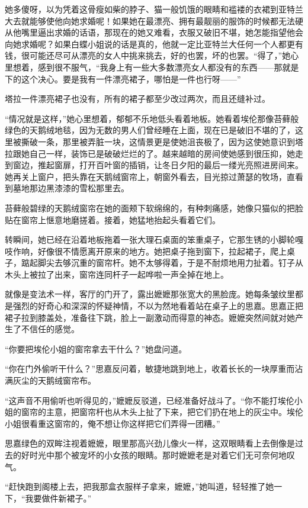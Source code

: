 \par 她多傻呀，以为凭着这骨瘦如柴的脖子、猫一般饥饿的眼睛和褴褛的衣裙到亚特兰大去就能够使他向她求婚呢！如果她在最漂亮、拥有最靓丽的服饰的时候都无法硬从他嘴里逼出求婚的话语，那现在的她又难看，衣服又破旧不堪，她怎能指望他会向她求婚呢？如果白蝶小姐说的话是真的，他就一定比亚特兰大任何一个人都更有钱，很可能还尽可从漂亮的女人中挑来挑去，好的也罢，坏的也罢。“得了，”她心里想着，感到很不服气，“我身上有一些大多数漂亮女人都没有的东西——那就是下的这个决心。要是我有一件漂亮裙子，哪怕是一件也行呀——”
\par 塔拉一件漂亮裙子也没有，所有的裙子都至少改过两次，而且还缝补过。
\par “情况就是这样，”她心里想着，郁郁不乐地低头看着地板。她看着埃伦那像苔藓般绿色的天鹅绒地毯，因为无数的男人们曾经睡在上面，现在已是破旧不堪的了，这里被撕破一条，那里被弄脏一块，这情景更是使她沮丧极了，因为这使她意识到塔拉跟她自己一样，装饰已是破破烂烂的了。越来越暗的房间使她感到很压抑，她走到窗边，推起窗扉，打开百叶窗的插销，让冬日夕阳的最后一缕光亮照进房间来。她再关上窗户，把头靠在天鹅绒窗帘上，朝窗外看去，目光掠过萧瑟的牧场，直看到墓地那边黑漆漆的雪松那里去。
\par 苔藓般碧绿的天鹅绒窗帘在她的面颊下软绵绵的，有种刺痛感，她像只猫似的把脸贴在窗帘上惬意地磨搓着。接着，她猛地抬起头看着它们。
\par 转瞬间，她已经在沿着地板拖着一张大理石桌面的笨重桌子，它那生锈的小脚轮嘎吱作响，好像很不情愿离开原来的地方。她把桌子拖到窗下，拉起裙子，爬上桌子，踮起脚尖去够沉重的窗帘杆。她不太够得着，于是不耐烦地用力扯着。钉子从木头上被拉了出来，窗帘连同杆子一起哗啦一声全掉在地上。
\par 就像是变法术一样，客厅的门开了，露出嬷嬷那张宽大的黑脸庞。她每条皱纹里都是强烈的好奇心和深深的怀疑神情，不以为然地看着站在桌子上的思嘉。思嘉正把裙子拉到膝盖处，准备往下跳，脸上一副激动而得意的神态。嬷嬷突然间就对她产生了不信任的感觉。
\par “你要把埃伦小姐的窗帘拿去干什么？”她盘问道。
\par “你在门外偷听干什么？”思嘉反问着，敏捷地跳到地上，收着长长的一块厚重而沾满灰尘的天鹅绒窗帘布。
\par “这声音不用偷听也听得见的，”嬷嬷反驳道，已经准备好战斗了。“你不能打埃伦小姐的窗帘的主意，把窗帘杆也从木头上扯了下来，把它们扔在地上的灰尘中。埃伦小姐很看重这窗帘的，俺不想让你这样把它们弄得一团糟。”
\par 思嘉绿色的双眸注视着嬷嬷，眼里那高兴劲儿像火一样，这双眼睛看上去倒像是过去的好时光中那个被宠坏的小女孩的眼睛。那时嬷嬷老是对着它们无可奈何地叹气。
\par “赶快跑到阁楼上去，把我那盒衣服样子拿来，嬷嬷，”她叫道，轻轻推了她一下，“我要做件新裙子。”
